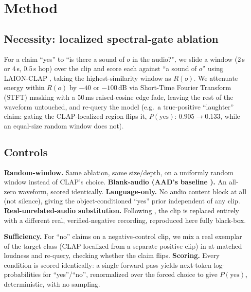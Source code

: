 \documentclass{article}
\begin{document}
\section{Method}

\subsection{Necessity: localized spectral-gate ablation}
For a claim ``yes'' to ``is there a sound of $o$ in the audio?'', we
slide a window (2\,s or 4\,s, 0.5\,s hop) over the clip and score each
against ``a sound of $o$'' using LAION-CLAP \cite{wu2023laionclap},
taking the highest-similarity window as $R(o)$. We attenuate energy
within $R(o)$ by $-40$ or $-100$\,dB via Short-Time Fourier Transform
(STFT) masking with a 50\,ms raised-cosine edge fade, leaving the rest of the waveform untouched, and
re-query the model (e.g.\ a true-positive ``laughter'' claim: gating
the CLAP-localized region flips it, $P(\text{yes})$: $0.905\to0.133$,
while an equal-size random window does not).

\subsection{Controls}
\textbf{Random-window.} Same ablation, same size/depth, on a uniformly
random window instead of CLAP's choice. \textbf{Blank-audio (AAD's
baseline \cite{hsu2025aad}).} An all-zero waveform, scored identically.
\textbf{Language-only.}\label{sec:langprior} No audio content block at
all (not silence), giving the object-conditioned ``yes'' prior
independent of any clip. \textbf{Real-unrelated-audio substitution.}
Following \cite{tracinggrounding2026}, the clip is replaced entirely
with a different real, verified-negative recording, reproduced here
fully black-box.

\textbf{Sufficiency.} For ``no'' claims on a negative-control clip, we
mix a real exemplar of the target class (CLAP-localized from a
separate positive clip) in at matched loudness and re-query, checking
whether the claim flips. \textbf{Scoring.} Every condition is scored
identically: a single forward pass yields next-token log-probabilities
for ``yes''/``no'', renormalized over the forced choice to give
$P(\text{yes})$, deterministic, with no sampling.
\end{document}
